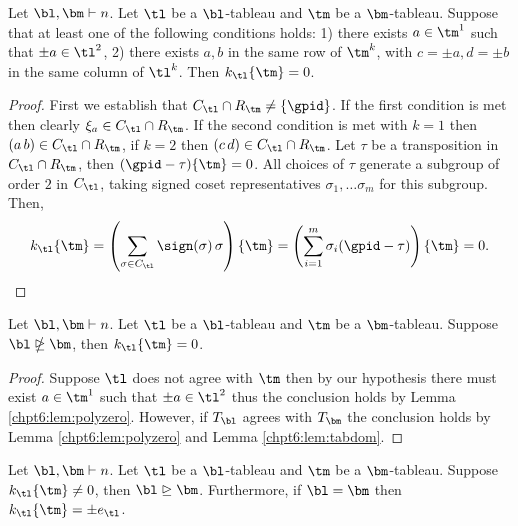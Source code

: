 \documentclass[11pt]{report}
\begin{document}
\begin{lemma}
	\label{chpt6:lem:polyzero}
	Let $\bl,\bm \vdash n$. Let $\tl$ be a $\bl$-tableau and $\tm$ be a $\bm$-tableau. Suppose that at least one of the following conditions holds: 1) there exists $ a\in \tm^{1}$ such that $\pm a \in \tl^{2}$, 2) there exists $a,b$ in the same row of $\tm^{k}$, with  $c =\pm a ,d = \pm b$ in the same column of $\tl^{k}$. Then $k_{\tl} \{\tm\} = 0$.
\end{lemma}

\begin{proof}
	First we establish that $C_{\tl} \cap R_{\tm} \neq \{\gpid\}$. If the first condition is met then clearly $\xi_{a} \in C_{\tl} \cap R_{\tm}$. If the second condition is met with $k=1$ then $(a \, b) \in C_{\tl} \cap R_{\tm}$, if $k=2$ then $(c \, d) \in C_{\tl} \cap R_{\tm}$.  Let $\tau$ be a transposition in $C_{\tl} \cap R_{\tm} $, then $(\gpid - \tau) \{\tm \}=0$. 
	All choices of $\tau$ generate a subgroup of order $2$ in $C_{\tl}$, taking signed coset representatives $\sigma_{1}, \ldots \sigma_{m}$ for this subgroup. Then,
	\[k_{\tl} \{\tm\} = \left(\sum_{\sigma \in C_{\tl}} 
	\sign(\sigma) \,\sigma \right) \{\tm\} =  \left(\sum_{i=1}^{m} 
	\sigma_{i} (\gpid - \tau)\right) \{\tm\} = 0. \qedhere \]
\end{proof}

\begin{lemma}
	\label{chpt6:lem:notdom}
	Let $\bl,\bm \vdash n$. Let $\tl$ be a $\bl$-tableau and $\tm$ be a $\bm$-tableau. Suppose $\bl \ntrianglerighteq \bm$, then $k_{\tl} \{\tm\} = 0$.
\end{lemma}
\begin{proof}
	Suppose $\tl$ does not agree with $\tm$ 
	then by our hypothesis there must exist $a \in \tm^{1}$ such 
	that $\pm a\in \tl^{2}$ thus the conclusion holds by 
	Lemma \ref{chpt6:lem:polyzero}. However, if $T_{\bl}$ agrees with $T_{\bm}$ the conclusion holds by  Lemma \ref{chpt6:lem:polyzero} and Lemma \ref{chpt6:lem:tabdom}. 
\end{proof}




\begin{corollary}
	\label{chpt6:cor:dom}
	Let $\bl,\bm \vdash n$. Let $\tl$ be a $\bl$-tableau and $\tm$ be a $\bm$-tableau. Suppose 
	$k_{\tl} \{\tm\} \neq 0$, then $\bl \trianglerighteq \bm$.  Furthermore, if $\bl = \bm$ then $k_{\tl} \{\tm\} = \pm e_{\tl}$.
\end{corollary}
\end{document}
